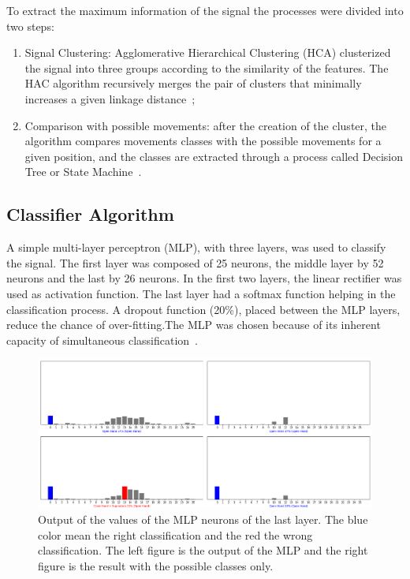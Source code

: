 \documentclass[letterpaper, 10 pt, conference]{ieeeconf}  %
\begin{document}
To extract the maximum information of the signal the processes were divided into two steps:

\begin{enumerate}
	\item Signal Clustering: Agglomerative Hierarchical Clustering (HCA) clusterized the signal into three groups according to the similarity of the features. The HAC algorithm recursively merges the pair of clusters that minimally increases a given linkage distance~\cite{c11,c12};
	\item Comparison with possible movements: after the creation of the cluster, the algorithm compares movements classes with the possible movements for a given position, and the classes are extracted through a process called Decision Tree or State Machine~\cite{c13}.
\end{enumerate}

\subsection{Classifier Algorithm}
A simple multi-layer perceptron (MLP), with three layers, was used to classify the signal. The first layer was composed of 25 neurons, the middle layer by 52 neurons and the last by 26 neurons. In the first two layers, the linear rectifier was used as activation function. The last layer had a softmax function helping in the classification process. A dropout function (20\%), placed between the MLP layers, reduce the chance of over-fitting.The MLP was chosen because of its inherent capacity of simultaneous classification~\cite{c5}.

\begin{figure}[h]
    \begin{center}
	\includegraphics[width=.8\linewidth]{images/output2.png}
	\end{center}
	\caption{Output of the values of the MLP neurons of the last layer. The blue color mean the right classification and the red the wrong classification. The left figure is the output of the MLP and the right figure is the result with the possible classes only.} \label{final_classification}
\end{figure}
\end{document}
